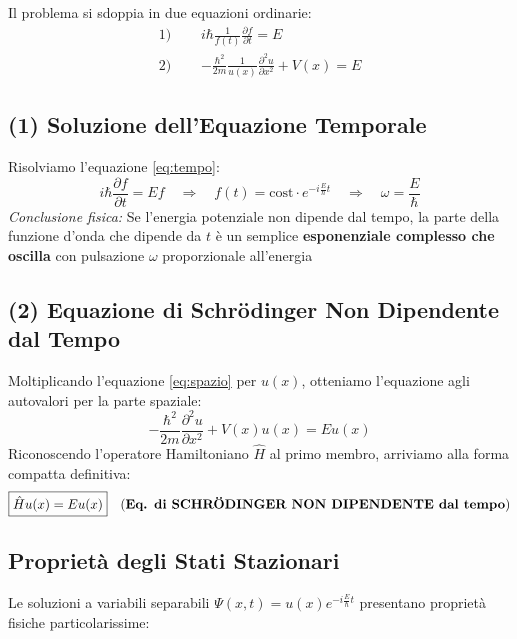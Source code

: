 \documentclass[11pt, a4paper]{article}
\begin{document}
Il problema si sdoppia in due equazioni ordinarie: %
\begin{align}
    \text{1) } \quad & i\hbar \frac{1}{f(t)} \frac{\partial f}{\partial t} = E \label{eq:tempo} \\ %
    \text{2) } \quad & -\frac{\hbar^2}{2m} \frac{1}{u(x)} \frac{\partial^2 u}{\partial x^2} + V(x) = E \label{eq:spazio} %
\end{align}

\subsection{(1) Soluzione dell'Equazione Temporale} %
Risolviamo l'equazione \ref{eq:tempo}: %
\begin{equation*}
    i\hbar \frac{\partial f}{\partial t} = E f \quad \Rightarrow \quad f(t) = \text{cost} \cdot e^{-i\frac{E}{\hbar}t} \quad \Rightarrow \quad \omega = \frac{E}{\hbar} %
\end{equation*}
\textit{Conclusione fisica:} Se l'energia potenziale non dipende dal tempo, la parte della funzione d'onda che dipende da $t$ è un semplice \textbf{esponenziale complesso che oscilla} con pulsazione $\omega$ proporzionale all'energia %

\subsection{(2) Equazione di Schrödinger Non Dipendente dal Tempo} %
Moltiplicando l'equazione \ref{eq:spazio} per $u(x)$, otteniamo l'equazione agli autovalori per la parte spaziale: %
\begin{equation*}
    -\frac{\hbar^2}{2m} \frac{\partial^2 u}{\partial x^2} + V(x) u(x) = E u(x) %
\end{equation*}
Riconoscendo l'operatore Hamiltoniano $\hat{H}$ al primo membro, arriviamo alla forma compatta definitiva: %
\begin{equation}
    \boxed{ \hat{H} u(x) = E u(x) } \quad \text{(\textbf{Eq. di SCHRÖDINGER NON DIPENDENTE dal tempo})} %
\end{equation}

\subsection{Proprietà degli Stati Stazionari} %

Le soluzioni a variabili separabili $\Psi(x,t) = u(x)e^{-i\frac{E}{\hbar}t}$ presentano proprietà fisiche particolarissime: \\
\end{document}
